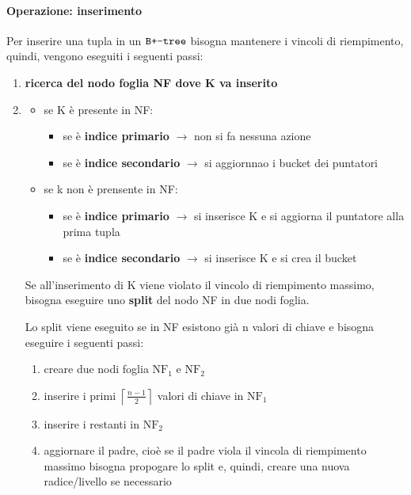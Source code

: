 \paragraph{Operazione: inserimento}
Per inserire una tupla in un $\verb|B+-tree|$ bisogna mantenere i vincoli di riempimento, quindi, vengono eseguiti i seguenti passi:
\begin{enumerate}[itemsep=\medskipamount]
  \item \textbf{ricerca del nodo foglia NF dove K va inserito}
  \item 
  \begin{itemize}[label=$\triangleright$, itemsep=\medskipamount]
    \item se K è presente in NF:
    \begin{itemize}[label=$\diamond$, itemsep=\smallskipamount]
      \item se è \textbf{indice primario} $\rightarrow$ non si fa nessuna azione
      \item se è \textbf{indice secondario} $\rightarrow$ si aggiornnao i bucket dei puntatori
    \end{itemize}
    \item se k non è prensente in NF:
    \begin{itemize}[label=$\diamond$, itemsep=\smallskipamount]
      \item se è \textbf{indice primario} $\rightarrow$ si inserisce K e si aggiorna il puntatore alla prima tupla
      \item se è \textbf{indice secondario} $\rightarrow$ si inserisce K e si crea il bucket
    \end{itemize}
  \end{itemize}
  Se all'inserimento di K viene violato il vincolo di riempimento massimo, bisogna eseguire uno \textbf{split} del nodo NF in due nodi foglia.

  Lo split viene eseguito se in NF esistono già $\mathrm{n}$ valori di chiave e bisogna eseguire i seguenti passi:
  \begin{enumerate}[itemsep=\smallskipamount]
    \item creare due nodi foglia $\mathrm{NF_1}$ e $\mathrm{NF_2}$
    \item inserire i primi $\left\lceil \frac{n - 1}{2} \right\rceil$ valori di chiave in $\mathrm{NF_1}$
    \item inserire i restanti in $\mathrm{NF_2}$
    \item aggiornare il padre, cioè se il padre viola il vincola di riempimento massimo bisogna propogare lo split e, quindi, creare una nuova radice/livello se necessario 
  \end{enumerate}
\end{enumerate}

